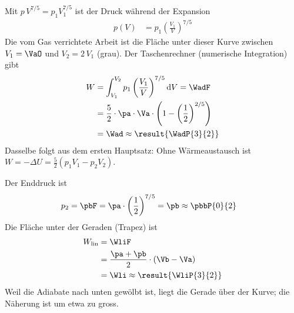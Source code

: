 \begin{center}
\end{center}

\begin{abcliste}
\abc Mit $p\,V^{7/5} = p_1V_1^{7/5}$ ist der Druck während der Expansion
\begin{align}
 p(V) &= p_1\left(\frac{V_1}{V}\right)^{7/5}
\end{align}
Die vom Gas verrichtete Arbeit ist die Fläche unter dieser Kurve zwischen $V_1 = \VaO$ und $V_2 = 2\,V_1$ (grau). Der Taschenrechner (numerische Integration) gibt
\begin{align}
 W &= \int_{V_1}^{V_2} p_1\left(\frac{V_1}{V}\right)^{7/5}\mathrm{d}V = \WadF \\
   &= \frac{5}{2}\cdot\pa\cdot\Va\cdot\left(1-\left(\frac{1}{2}\right)^{2/5}\right) \\
   &= \Wad \approx \result{\WadP{3}{2}}
\end{align}
Dasselbe folgt aus dem ersten Hauptsatz: Ohne Wärmeaustausch ist $W = -\Delta U = \frac{5}{2}\left(p_1V_1-p_2V_2\right)$.

\abc Der Enddruck ist
\begin{align}
 p_2 &= \pbF = \pa\cdot\left(\frac{1}{2}\right)^{7/5} = \pb \approx \pbbP{0}{2}
\end{align}
Die Fläche unter der Geraden (Trapez) ist
\begin{align}
 W_\text{lin} &= \WliF \\
   &= \frac{\pa+\pb}{2}\cdot\left(\Vb-\Va\right) \\
   &= \Wli \approx \result{\WliP{3}{2}}
\end{align}
Weil die Adiabate nach unten gewölbt ist, liegt die Gerade über der Kurve; die Näherung ist um etwa  zu gross.
\end{abcliste}

